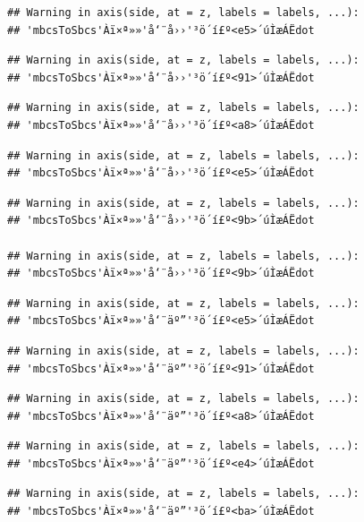 \documentclass[
]{article}
\begin{document}
\begin{verbatim}
## Warning in axis(side, at = z, labels = labels, ...):
## 'mbcsToSbcs'Àï×ª»»'å‘¨å››'³ö´í£º<e5>´úÌæÁËdot
\end{verbatim}

\begin{verbatim}
## Warning in axis(side, at = z, labels = labels, ...):
## 'mbcsToSbcs'Àï×ª»»'å‘¨å››'³ö´í£º<91>´úÌæÁËdot
\end{verbatim}

\begin{verbatim}
## Warning in axis(side, at = z, labels = labels, ...):
## 'mbcsToSbcs'Àï×ª»»'å‘¨å››'³ö´í£º<a8>´úÌæÁËdot
\end{verbatim}

\begin{verbatim}
## Warning in axis(side, at = z, labels = labels, ...):
## 'mbcsToSbcs'Àï×ª»»'å‘¨å››'³ö´í£º<e5>´úÌæÁËdot
\end{verbatim}

\begin{verbatim}
## Warning in axis(side, at = z, labels = labels, ...):
## 'mbcsToSbcs'Àï×ª»»'å‘¨å››'³ö´í£º<9b>´úÌæÁËdot

## Warning in axis(side, at = z, labels = labels, ...):
## 'mbcsToSbcs'Àï×ª»»'å‘¨å››'³ö´í£º<9b>´úÌæÁËdot
\end{verbatim}

\begin{verbatim}
## Warning in axis(side, at = z, labels = labels, ...):
## 'mbcsToSbcs'Àï×ª»»'å‘¨äº”'³ö´í£º<e5>´úÌæÁËdot
\end{verbatim}

\begin{verbatim}
## Warning in axis(side, at = z, labels = labels, ...):
## 'mbcsToSbcs'Àï×ª»»'å‘¨äº”'³ö´í£º<91>´úÌæÁËdot
\end{verbatim}

\begin{verbatim}
## Warning in axis(side, at = z, labels = labels, ...):
## 'mbcsToSbcs'Àï×ª»»'å‘¨äº”'³ö´í£º<a8>´úÌæÁËdot
\end{verbatim}

\begin{verbatim}
## Warning in axis(side, at = z, labels = labels, ...):
## 'mbcsToSbcs'Àï×ª»»'å‘¨äº”'³ö´í£º<e4>´úÌæÁËdot
\end{verbatim}

\begin{verbatim}
## Warning in axis(side, at = z, labels = labels, ...):
## 'mbcsToSbcs'Àï×ª»»'å‘¨äº”'³ö´í£º<ba>´úÌæÁËdot
\end{verbatim}
\end{document}
